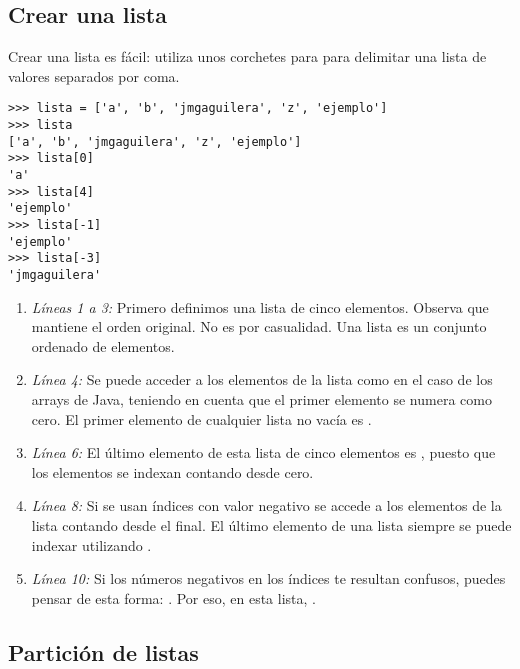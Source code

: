 \subsection{Crear una lista}

Crear una lista es fácil: utiliza unos corchetes para para delimitar una lista de valores separados por coma.

\noindent\begin{minipage}{\textwidth}
\begin{lstlisting}[mathescape=True]
>>> lista = ['a', 'b', 'jmgaguilera', 'z', 'ejemplo']
>>> lista
['a', 'b', 'jmgaguilera', 'z', 'ejemplo']
>>> lista[0]
'a'
>>> lista[4]
'ejemplo'
>>> lista[-1]
'ejemplo'
>>> lista[-3]
'jmgaguilera'
\end{lstlisting}
\end{minipage}

\begin{enumerate}

\item \emph{Líneas 1 a 3:} Primero definimos una lista de cinco elementos. Observa que mantiene el orden original. No es por casualidad. Una lista es un conjunto ordenado de elementos.

\item \emph{Línea 4:} Se puede acceder a los elementos de la lista como en el caso de los arrays de Java, teniendo en cuenta que el primer elemento se numera como cero. El primer elemento de cualquier lista no vacía es .

\item \emph{Línea 6:} El último elemento de esta lista de cinco elementos es , puesto que los elementos se indexan contando desde cero.

\item \emph{Línea 8:} Si se usan índices con valor negativo se accede a los elementos de la lista contando desde el final. El último elemento de una lista siempre se puede indexar utilizando .

\item \emph{Línea 10:} Si los números negativos en los índices te resultan confusos, puedes pensar de esta forma: . Por eso, en esta lista, .

\end{enumerate}

\subsection{Partición de listas}

